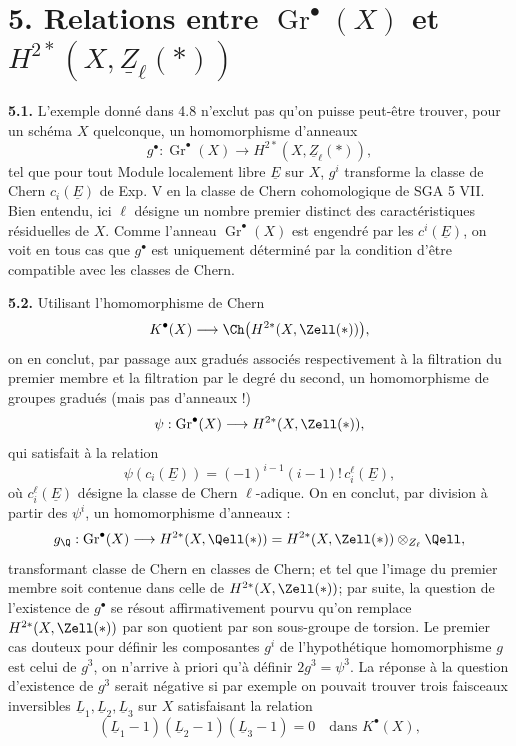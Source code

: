 
\section*{5. Relations entre \(\operatorname{Gr}^\bullet(X)\) et \(H^{2*}(X,\underline{Z}_\ell(*))\)}

\textbf{5.1.} L'exemple donné dans 4.8 n'exclut pas qu'on puisse peut-être trouver, pour un schéma $X$ quelconque, un homomorphisme d'anneaux
\[
 g^\bullet:\operatorname{Gr}^\bullet(X)\longrightarrow H^{2*}(X,\underline{Z}_\ell(*)),
\]
tel que pour tout Module localement libre $\underline{E}$ sur $X$, $g^i$ transforme la classe de Chern $c_i(\underline{E})$ de Exp. V en la classe de Chern cohomologique de SGA 5 VII. Bien entendu, ici $\ell$ désigne un nombre premier distinct des caractéristiques résiduelles de $X$. Comme l'anneau $\operatorname{Gr}^\bullet(X)$ est engendré par les $c^i(\underline{E})$, on voit en tous cas que $g^\bullet$ est uniquement déterminé par la condition d'être compatible avec les classes de Chern.

\textbf{5.2.} Utilisant l'homomorphisme de Chern
\[
 K^\bullet(X)\longrightarrow\Ch\bigl(H^{2*}(X,\Zell(*))\bigr),
\]
on en conclut, par passage aux gradués associés respectivement à la filtration du premier membre et la filtration par le degré du second, un homomorphisme de groupes gradués (mais pas d'anneaux !)
\[
 \psi:\operatorname{Gr}^\bullet(X)\longrightarrow H^{2*}(X,\Zell(*)),
\]
qui satisfait à la relation
\[
 \psi(c_i(\underline{E}))=(-1)^{i-1}(i-1)!\,c_i^\ell(\underline{E}),
\]
où $c_i^\ell(\underline{E})$ désigne la classe de Chern $\ell$-adique. On en conclut, par division à partir des $\psi^i$, un homomorphisme d'anneaux :
\[
 g_\Q:\operatorname{Gr}^\bullet(X)\longrightarrow
 H^{2*}(X,\Qell(*))=
 H^{2*}(X,\Zell(*))\otimes_{Z_\ell}\Qell,
\]
transformant classe de Chern en classes de Chern; et tel que l'image du premier membre soit contenue dans celle de $H^{2*}(X,\Zell(*))$; par suite, la question de l'existence de $g^\bullet$ se résout affirmativement pourvu qu'on remplace $H^{2*}(X,\Zell(*))$ par son quotient par son sous-groupe de torsion. Le premier cas douteux pour définir les composantes $g^i$ de l'hypothétique homomorphisme $g$ est celui de $g^3$, on n'arrive à priori qu'à définir $2g^3=\psi^3$. La réponse à la question d'existence de $g^3$ serait négative si par exemple on pouvait trouver trois faisceaux inversibles $\underline{L}_1,\underline{L}_2,\underline{L}_3$ sur $X$ satisfaisant la relation
\[
 (\underline{L}_1-1)(\underline{L}_2-1)(\underline{L}_3-1)=0\quad\text{dans }K^\bullet(X),
\]
